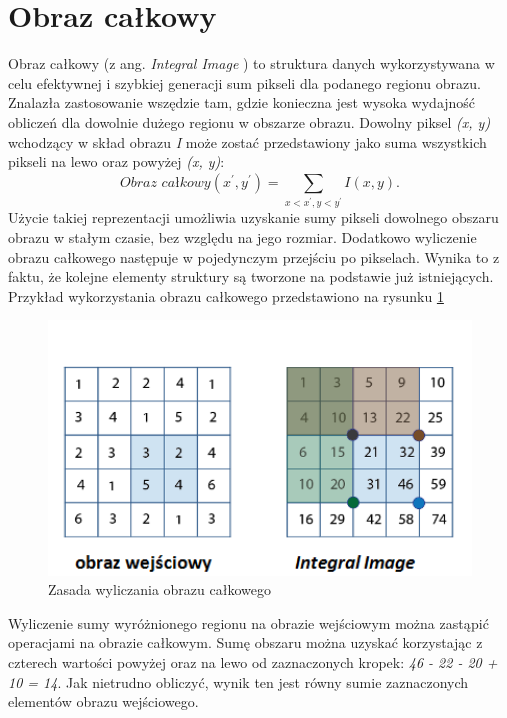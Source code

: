 \section{Obraz całkowy}
\label{sec:IntegralImage}
Obraz całkowy (z ang. \textit{Integral Image} \cite{ViolaJonesIntegralImage}) to struktura danych wykorzystywana w celu efektywnej i szybkiej generacji sum pikseli dla podanego regionu obrazu. Znalazła zastosowanie wszędzie tam, gdzie konieczna jest wysoka wydajność obliczeń dla dowolnie dużego regionu w obszarze obrazu. Dowolny piksel \textit{(x, y)} wchodzący w skład obrazu \textit{I} może zostać przedstawiony jako suma wszystkich pikseli na lewo oraz powyżej \textit{(x, y)}:
\begin{equation}
\textit{Obraz całkowy}(x^{'},y^{'}) = \sum_{x<x^{'},y<y^{'}}^{}I(x,y).
\end{equation}
Użycie takiej reprezentacji umożliwia uzyskanie sumy pikseli dowolnego obszaru obrazu w stałym czasie, bez względu na jego rozmiar. Dodatkowo wyliczenie obrazu całkowego następuje w pojedynczym przejściu po pikselach. Wynika to z faktu, że kolejne elementy struktury są tworzone na podstawie już istniejących. Przykład wykorzystania obrazu całkowego  przedstawiono na rysunku \ref{im: Integral Image} 

\begin{figure}[h]
	\includegraphics[width=15cm]{integral_image}
	\centering
	\caption{Zasada wyliczania obrazu całkowego}
	\label{im: Integral Image}
\end{figure}    

Wyliczenie sumy wyróżnionego regionu na obrazie wejściowym można zastąpić operacjami na obrazie całkowym. Sumę obszaru można uzyskać korzystając z czterech wartości powyżej oraz na lewo od zaznaczonych kropek: \textit{46 - 22 - 20 + 10 = 14}. Jak nietrudno obliczyć, wynik ten jest równy sumie zaznaczonych elementów obrazu wejściowego.

